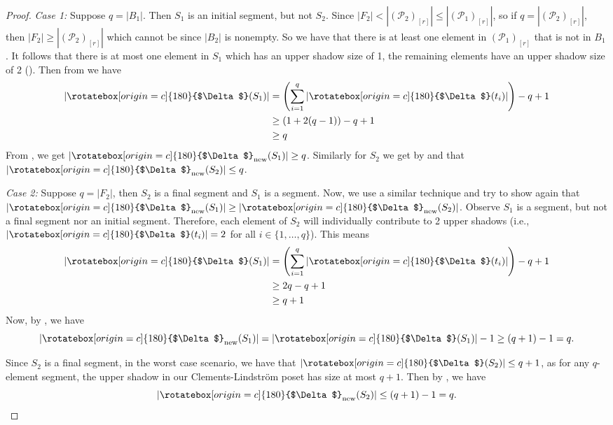 \documentclass[11pt, reqno]{amsart}
\renewcommand{\P}{{\mathcal P}}
\newcommand{\uSdw}{\rotatebox[origin=c]{180}{$\Delta$}}
\theoremstyle{plain} %
\theoremstyle{definition}
\theoremstyle{remark}
\numberwithin{equation}{section}  %
\begin{document}
\begin{proof}
\emph{Case 1:} Suppose $q = |B_1|$. Then $S_1$ is an initial segment, but not $S_2$. Since $|F_2| < |(\P_2)_{[r]}| \leq |(\P_1)_{[r]}|$, so if $q = |(\P_2)_{[r]}|$, then $|F_2| \geq |(\P_2)_{[r]}|$ which cannot be since $|B_2|$ is nonempty. So we have that there is at least one element in $(\P_1)_{[r]}$ that is not in $B_1$. It follows that there is at most one element in $S_1$ which has an upper shadow size of 1, the remaining elements have an upper shadow size of 2 (). Then from  we have
\begin{equation*}
\begin{split}
\lvert\uSdw(S_1)\rvert &= \left(\sum_{i = 1}^{q}|\uSdw(t_i)|\right)- q + 1\\
                       &\geq (1 + 2(q - 1)) - q + 1 \\
                       &\geq q
\end{split} 
\end{equation*}
From , we get $|\uSdw_{\text{new}}(S_1)| \geq q$. Similarly for $S_2$ we get by  and  that $|\uSdw_{\text{new}}(S_2)| \leq q$.

\emph{Case 2:} Suppose \(q = \lvert F_2 \rvert \), then \( S_2 \) is a final segment and \( S_1 \) is a segment. Now, we use a similar technique and try to show again that \( |\uSdw_{\text{new}} (S_1)| \geq |\uSdw_{\text{new}}(S_2)| \). Observe \( S_1 \) is a segment, but not a final segment nor an initial segment. Therefore, each element of \( S_2 \) will individually contribute to 2 upper shadows (i.e., \( |\uSdw(t_i)| = 2 \) for all \( i \in \{1, \ldots, q\} \)). This means
\begin{equation*}
    \begin{split}
        |\uSdw(S_1)| & = \left(\sum_{i=1}^{q} |\uSdw(t_i)|\right) - q + 1 \\
                     & \geq 2q - q + 1 \\
                     & \geq q + 1
    \end{split} 
\end{equation*}
Now, by , we have 
\[ |\uSdw_{\text{new}}(S_1)| = |\uSdw(S_1)| - 1 \geq (q + 1) - 1 = q. \]

Since \( S_2 \) is a final segment, in the worst case scenario, we have that \( |\uSdw(S_2)| \leq q + 1 \), as for any \( q \)-element segment, the upper shadow in our Clements-Lindstr\"om poset has size at most \( q + 1 \). Then by , we have
\[ |\uSdw_{\text{new}}(S_2)| \leq (q + 1) - 1 = q. \]


\end{proof}
\end{document}
